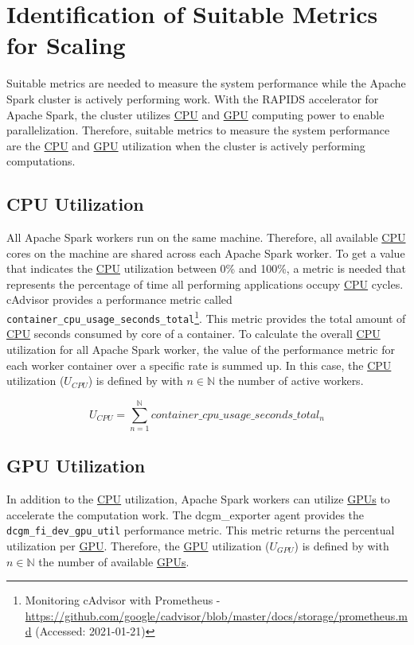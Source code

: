 \section{Identification of Suitable Metrics for Scaling}
\label{sec:05_metrics}
Suitable metrics are needed to measure the system performance while the Apache Spark cluster is actively performing work.
With the RAPIDS accelerator for Apache Spark, the cluster utilizes \hyperlink{abbr:cpu}{CPU} and \hyperlink{abbr:gpu}{GPU} computing power to enable parallelization.
Therefore, suitable metrics to measure the system performance are the \hyperlink{abbr:cpu}{CPU} and \hyperlink{abbr:gpu}{GPU} utilization when the cluster is actively performing computations.


\subsection{CPU Utilization}
All Apache Spark workers run on the same machine. Therefore, all available \hyperlink{abbr:cpu}{CPU} cores on the machine are shared across each Apache Spark worker.
%
To get a value that indicates the \hyperlink{abbr:cpu}{CPU} utilization between 0\% and 100\%, a metric is needed that represents the percentage of time all performing applications occupy \hyperlink{abbr:cpu}{CPU} cycles.
cAdvisor provides a performance metric called \texttt{container\_cpu\_usage\_seconds\_total}\footnote{Monitoring cAdvisor with Prometheus - \url{https://github.com/google/cadvisor/blob/master/docs/storage/prometheus.md} (Accessed: 2021-01-21)}. This metric provides the total amount of \hyperlink{abbr:cpu}{CPU} seconds consumed by core of a container. 
To calculate the overall \hyperlink{abbr:cpu}{CPU} utilization for all Apache Spark worker, the value of the performance metric for each worker container over a specific rate is summed up.
%
In this case, the \hyperlink{abbr:cpu}{CPU} utilization ($U_{CPU}$) is defined by  with $n \in \mathbb{N}$ the number of active workers.

\begin{equation}
U_{CPU}=\sum_{n=1}^{\mathbb{N}}container\_cpu\_usage\_seconds\_total_{n}
\label{eq:05_metrics_cpu}
\end{equation}

\subsection{GPU Utilization}
%
In addition to the \hyperlink{abbr:cpu}{CPU} utilization, Apache Spark workers can utilize \hyperlink{abbr:gpu}{GPUs} to accelerate the computation work.	
The dcgm\_exporter agent provides the \texttt{dcgm\_fi\_dev\_gpu\_util} performance metric. This metric returns the percentual utilization per \hyperlink{abbr:gpu}{GPU}.
Therefore, the \hyperlink{abbr:gpu}{GPU} utilization ($U_{GPU}$) is defined by  with $n \in \mathbb{N}$ the number of available \hyperlink{abbr:gpu}{GPUs}.


